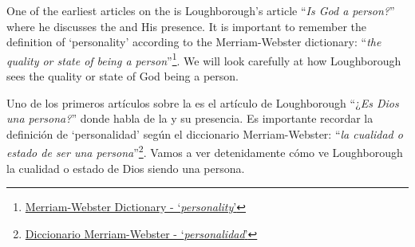 



One of the earliest articles on the  is Loughborough’s article “\textit{Is God a person?}” where he discusses the  and His presence. It is important to remember the definition of ‘personality’ according to the Merriam-Webster dictionary: “\textit{the quality or state of being a person}”\footnote{\href{https://www.merriam-webster.com/dictionary/personality}{Merriam-Webster Dictionary - ‘\textit{personality}’}}. We will look carefully at how Loughborough sees the quality or state of God being a person.


Uno de los primeros artículos sobre la  es el artículo de Loughborough “¿\textit{Es Dios una persona?}” donde habla de la  y su presencia. Es importante recordar la definición de ‘personalidad’ según el diccionario Merriam-Webster: “\textit{la cualidad o estado de ser una persona}”\footnote{\href{https://www.merriam-webster.com/dictionary/personality}{Diccionario Merriam-Webster - ‘\textit{personalidad}’}}. Vamos a ver detenidamente cómo ve Loughborough la cualidad o estado de Dios siendo una persona.


